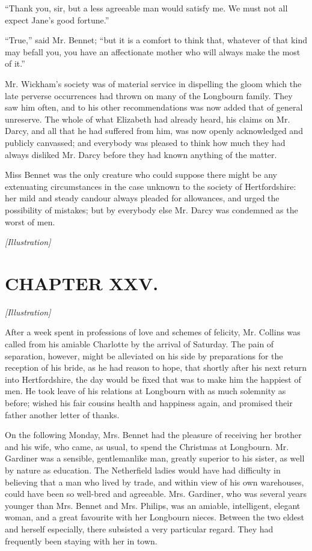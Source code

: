 \documentclass[12pt]{book}
\begin{document}
``Thank you, sir, but a less agreeable man would satisfy me. We must not all expect Jane's good fortune.''

``True,'' said Mr. Bennet; ``but it is a comfort to think that, whatever of that kind may befall you, you have an affectionate mother who will always make the most of it.''

Mr. Wickham's society was of material service in dispelling the gloom which the late perverse occurrences had thrown on many of the Longbourn family. They saw him often, and to his other recommendations was now added that of general unreserve. The whole of what Elizabeth had already heard, his claims on Mr. Darcy, and all that he had suffered from him, was now openly acknowledged and publicly canvassed; and everybody was pleased to think how much they had always disliked Mr. Darcy before they had known anything of the matter.

Miss Bennet was the only creature who could suppose there might be any extenuating circumstances in the case unknown to the society of Hertfordshire: her mild and steady candour always pleaded for allowances, and urged the possibility of mistakes; but by everybody else Mr. Darcy was condemned as the worst of men.

\emph{[Illustration]}

\chapter{CHAPTER XXV.}

\emph{[Illustration]}

After a week spent in professions of love and schemes of felicity, Mr. Collins was called from his amiable Charlotte by the arrival of Saturday. The pain of separation, however, might be alleviated on his side by preparations for the reception of his bride, as he had reason to hope, that shortly after his next return into Hertfordshire, the day would be fixed that was to make him the happiest of men. He took leave of his relations at Longbourn with as much solemnity as before; wished his fair cousins health and happiness again, and promised their father another letter of thanks.

On the following Monday, Mrs. Bennet had the pleasure of receiving her brother and his wife, who came, as usual, to spend the Christmas at Longbourn. Mr. Gardiner was a sensible, gentlemanlike man, greatly superior to his sister, as well by nature as education. The Netherfield ladies would have had difficulty in believing that a man who lived by trade, and within view of his own warehouses, could have been so well-bred and agreeable. Mrs. Gardiner, who was several years younger than Mrs. Bennet and Mrs. Philips, was an amiable, intelligent, elegant woman, and a great favourite with her Longbourn nieces. Between the two eldest and herself especially, there subsisted a very particular regard. They had frequently been staying with her in town.
\end{document}
